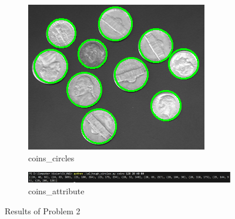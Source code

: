 \documentclass[bwprint]{gmcmthesis}
\numberwithin{figure}{section}
\begin{document}
\begin{figure}[h]
\begin{subfigure}[b]{0.3\textwidth}
    \end{subfigure}
    \hfill
    \begin{subfigure}[b]{0.3\textwidth}
        \centering
        \includegraphics[width=\textwidth]{../output/coins_circles.png}
        \caption{coins\_circles}
        \label{fig:subfigure11}
    \end{subfigure}
    \newline
    
    \begin{subfigure}[b]{\textwidth}
        \centering
        \includegraphics[width=\textwidth]{../output/coins_attribute.png}
        \caption{coins\_attribute}
        \label{fig:subfigure12}
    \end{subfigure}
    \caption{Results of Problem 2}
\end{figure}
\end{document}

